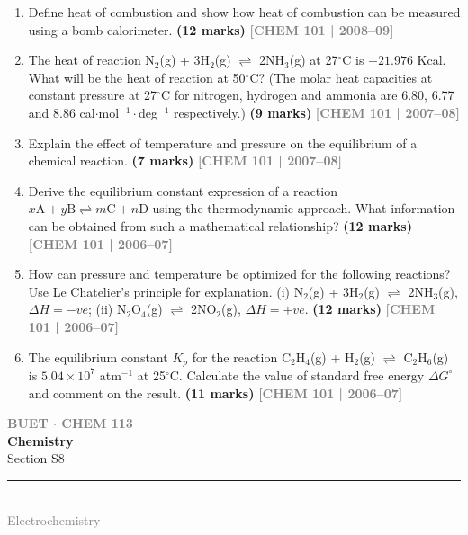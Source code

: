 \documentclass[12pt,a3paper]{article}
\newcommand{\yr}[1]{\hfill\textcolor{gray}{\small\textbf{[#1]}}}
\newcommand{\mk}[1]{\textcolor{orange!70!black}{\small\textbf{(#1 marks)}}}
\newcommand{\secdivider}[4]{%
  \newpage\thispagestyle{empty}%
  \vspace*{\fill}%
  \begin{tcolorbox}[enhanced,colback=#4!7,colframe=#3,boxrule=1.5pt,arc=8pt,
    left=20pt,right=20pt,top=22pt,bottom=22pt,
    shadow={3pt}{-3pt}{0pt}{black!15}]
    \centering
    {\large\textcolor{gray}{\textbf{BUET $\cdot$ CHEM 113}}}\\[8pt]
    {\fontsize{26}{32}\selectfont\bfseries\textcolor{#3}{Chemistry}}\\[6pt]
    {\fontsize{15}{19}\selectfont\textcolor{dgray}{#1}}\\[12pt]
    \textcolor{#3!60}{\rule{0.5\textwidth}{0.5pt}}\\[6pt]
    {\small\textcolor{gray}{#2}}
  \end{tcolorbox}%
  \vspace*{\fill}\newpage%
}
\begin{document}
\begin{enumerate}
\item Define heat of combustion and show how heat of combustion can be measured using a bomb calorimeter. \mk{12}
\yr{CHEM 101 | 2008--09}



\item The heat of reaction N$_2$(g) + 3H$_2$(g) $\rightleftharpoons$ 2NH$_3$(g) at 27$^\circ$C is $-21.976$ Kcal. What will be the heat of reaction at 50$^\circ$C? (The molar heat capacities at constant pressure at 27$^\circ$C for nitrogen, hydrogen and ammonia are 6.80, 6.77 and 8.86 cal$\cdot$mol$^{-1}\cdot$deg$^{-1}$ respectively.) \mk{9}
\yr{CHEM 101 | 2007--08}



\item Explain the effect of temperature and pressure on the equilibrium of a chemical reaction. \mk{7}
\yr{CHEM 101 | 2007--08}





\item Derive the equilibrium constant expression of a reaction $x\text{A} + y\text{B} \rightleftharpoons m\text{C} + n\text{D}$ using the thermodynamic approach. What information can be obtained from such a mathematical relationship? \mk{12}
\yr{CHEM 101 | 2006--07}



\item How can pressure and temperature be optimized for the following reactions? Use Le Chatelier's principle for explanation. (i) N$_2$(g) + 3H$_2$(g) $\rightleftharpoons$ 2NH$_3$(g), $\Delta H = -ve$; (ii) N$_2$O$_4$(g) $\rightleftharpoons$ 2NO$_2$(g), $\Delta H = +ve$. \mk{12}
\yr{CHEM 101 | 2006--07}



\item The equilibrium constant $K_p$ for the reaction C$_2$H$_4$(g) + H$_2$(g) $\rightleftharpoons$ C$_2$H$_6$(g) is $5.04 \times 10^7$ atm$^{-1}$ at 25$^\circ$C. Calculate the value of standard free energy $\Delta G^\circ$ and comment on the result. \mk{11}
\yr{CHEM 101 | 2006--07}



\end{enumerate}
\newpage

\secdivider{Section S8}{Electrochemistry}{cA}{cA}
\label{sec:S8}
\end{document}
